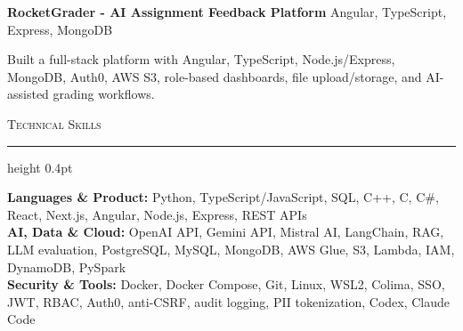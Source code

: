 \documentclass[letterpaper,11pt]{article}
\newcommand{\resumesection}[1]{%
  \par\vspace{2pt}%
  {\large\scshape #1}\par\vspace{2pt}%
  \hrule height 0.4pt\vspace{2pt}%
}
\newcommand{\projectHeading}[2]{
  \textbf{#1} \hfill #2
}
\begin{document}
\projectHeading{RocketGrader - AI Assignment Feedback Platform}{Angular, TypeScript, Express, MongoDB}
\begin{tightitemize}
  \item Built a full-stack platform with Angular, TypeScript, Node.js/Express, MongoDB, Auth0, AWS S3, role-based dashboards, file upload/storage, and AI-assisted grading workflows.
\end{tightitemize}

\resumesection{Technical Skills}
\textbf{Languages \& Product:} Python, TypeScript/JavaScript, SQL, C++, C, C\#, React, Next.js, Angular, Node.js, Express, REST APIs\\
\textbf{AI, Data \& Cloud:} OpenAI API, Gemini API, Mistral AI, LangChain, RAG, LLM evaluation, PostgreSQL, MySQL, MongoDB, AWS Glue, S3, Lambda, IAM, DynamoDB, PySpark\\
\textbf{Security \& Tools:} Docker, Docker Compose, Git, Linux, WSL2, Colima, SSO, JWT, RBAC, Auth0, anti-CSRF, audit logging, PII tokenization, Codex, Claude Code
\end{document}
